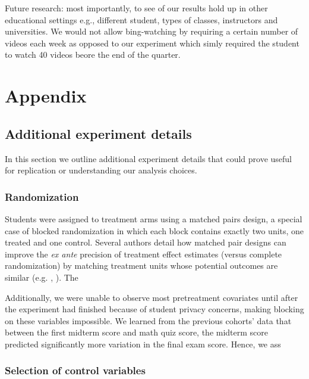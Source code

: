 \documentclass[12pt]{article}
\begin{document}
Future research:  most importantly, to see of our results hold up in other educational settings e.g., different student, types of classes, instructors and universities.  We would not allow bing-watching by requiring a certain number of videos each week as opposed to our experiment which simly required the student to watch 40 videos beore the end of the quarter.



\printbibliography


\section*{Appendix}

\renewcommand{\thesubsection}{\Alph{subsection}}

\subsection{Additional experiment details}

In this section we outline additional experiment details that could prove useful for replication or understanding our analysis choices.

\subsubsection{Randomization} \label{a_randomization}
Students were assigned to treatment arms using a matched pairs design, a special case of blocked randomization in which each block contains exactly two units, one treated and one control. Several authors detail how matched pair designs can improve the \textit{ex ante} precision of treatment effect estimates (versus complete randomization) by matching treatment units whose potential outcomes are similar (e.g. \cite{ir2015}, \cite{ai2017}). The 

Additionally, we were unable to observe most pretreatment covariates until after the experiment had finished because of student privacy concerns, making blocking on these variables impossible. We learned from the previous cohorts' data that between the first midterm score and math quiz score, the midterm score predicted significantly more variation in the final exam score. Hence, we ass

\subsubsection{Selection of control variables} \label{a_selection}
\end{document}
